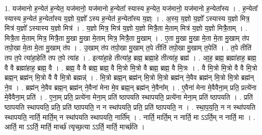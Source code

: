 \documentclass[17pt]{extarticle}
\begin{document}
1. यज॑मानो ह॒न्येत॑ ह॒न्येत॒ यज॑मानो॒ यज॑मानो ह॒न्येता᳚ स्यास्य ह॒न्येत॒ यज॑मानो॒ यज॑मानो ह॒न्येता᳚स्य । . ह॒न्येता᳚ स्यास्य ह॒न्येत॑ ह॒न्येता᳚स्य य॒ज्ञो य॒ज्ञो᳚ ऽस्य ह॒न्येत॑ ह॒न्येता᳚स्य य॒ज्ञ्ः । . अ॒स्य॒ य॒ज्ञो य॒ज्ञो᳚ ऽस्यास्य य॒ज्ञो मित्र॒ मित्र॑ य॒ज्ञो᳚ ऽस्यास्य य॒ज्ञो मित्र॑ । . य॒ज्ञो मित्र॒ मित्र॑ य॒ज्ञो य॒ज्ञो मित्रै॒ता मे॒ताम् मित्र॑ य॒ज्ञो य॒ज्ञो मित्रै॒ताम् । . मित्रै॒ता मे॒ताम् मित्र॒ मित्रै॒ता मु॒खा मु॒खा मे॒ताम् मित्र॒ मित्रै॒ता मु॒खाम् । . ए॒ता मु॒खा मु॒खा मे॒ता मे॒ता मु॒खाम् त॑प तपो॒खा मे॒ता मे॒ता मु॒खाम् त॑प । . उ॒खाम् त॑प तपो॒खा मु॒खाम् त॒पे तीति॑ तपो॒खा मु॒खाम् त॒पेति॑ । . त॒पे तीति॑ तप त॒पे त्या॑हा॒हेति॑ तप त॒पे त्या॑ह । . इत्या॑हा॒हे तीत्या॑ह॒ ब्रह्म॒ ब्रह्मा॒हे तीत्या॑ह॒ ब्रह्म॑ । . आ॒ह॒ ब्रह्म॒ ब्रह्मा॑हाह॒ ब्रह्म॒ वै वै ब्रह्मा॑हाह॒ ब्रह्म॒ वै । . ब्रह्म॒ वै वै ब्रह्म॒ ब्रह्म॒ वै मि॒त्रो मि॒त्रो वै ब्रह्म॒ ब्रह्म॒ वै मि॒त्रः । . वै मि॒त्रो मि॒त्रो वै वै मि॒त्रो ब्रह्म॒न् ब्रह्म॑न् मि॒त्रो वै वै मि॒त्रो ब्रह्मन्न्॑ । . मि॒त्रो ब्रह्म॒न् ब्रह्म॑न् मि॒त्रो मि॒त्रो ब्रह्म॑न् ने॒वैव ब्रह्म॑न् मि॒त्रो मि॒त्रो ब्रह्म॑न् ने॒व । . ब्रह्म॑न् ने॒वैव ब्रह्म॒न् ब्रह्म॑न् ने॒वैना॑ मेना मे॒व ब्रह्म॒न् ब्रह्म॑न् ने॒वैना᳚म् । . ए॒वैना॑ मेना मे॒वैवैना॒म् प्रति॒ प्रत्ये॑ना मे॒वैवैना॒म् प्रति॑ । . ए॒ना॒म् प्रति॒ प्रत्ये॑ना मेना॒म् प्रति॑ ष्ठापयति स्थापयति॒ प्रत्ये॑ना मेना॒म् प्रति॑ ष्ठापयति । . प्रति॑ ष्ठापयति स्थापयति॒ प्रति॒ प्रति॑ ष्ठापयति॒ न न स्था॑पयति॒ प्रति॒ प्रति॑ ष्ठापयति॒ न । . स्था॒प॒य॒ति॒ न न स्था॑पयति स्थापयति॒ नार्ति॒ मार्ति॒म् न स्था॑पयति स्थापयति॒ नार्ति᳚म् । . नार्ति॒ मार्ति॒म् न नार्ति॒ मा ऽऽर्ति॒म् न नार्ति॒ मा । . आर्ति॒ मा ऽऽर्ति॒ मार्ति॒ मार्च्छ॑ त्यृच्छ॒त्या ऽऽर्ति॒ मार्ति॒ मार्च्छ॑ति । \newline
\end{document}
